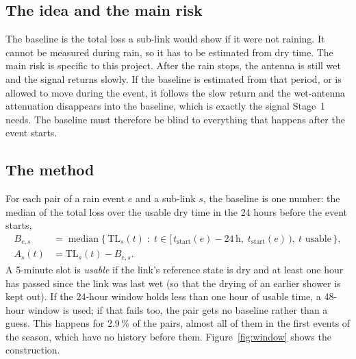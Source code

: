 \documentclass[11pt,a4paper]{article}
\begin{document}
\subsection{The idea and the main risk}

The baseline is the total loss a sub-link would show if it were not raining. It cannot be measured during rain, so it
has to be estimated from dry time. The main risk is specific to this project. After the rain stops, the antenna is
still wet and the signal returns slowly. If the baseline is estimated from that period, or is allowed to move during
the event, it follows the slow return and the wet-antenna attenuation disappears into the baseline, which is exactly
the signal Stage~1 needs. The baseline must therefore be blind to everything that happens after the event starts.

\subsection{The method}

For each pair of a rain event $e$ and a sub-link $s$, the baseline is one number: the median of the total loss over
the usable dry time in the 24 hours before the event starts,
\begin{equation}
\begin{aligned}
B_{e,s} &= \operatorname*{median}\bigl\{\, \mathrm{TL}_{s}(t) \;:\; t \in [\,t_{\mathrm{start}}(e) - 24\,\mathrm{h},\; t_{\mathrm{start}}(e)\,),\ t \text{ usable} \,\bigr\}, \\
A_{s}(t) &= \mathrm{TL}_{s}(t) - B_{e,s} .
\end{aligned}
\label{eq:baseline}
\end{equation}
A 5-minute slot is \emph{usable} if the link's reference state is dry and at least one hour has passed since the link
was last wet (so that the drying of an earlier shower is kept out). If the 24-hour window holds less than one hour of
usable time, a 48-hour window is used; if that fails too, the pair gets no baseline rather than a guess. This happens
for 2.9\,\% of the pairs, almost all of them in the first events of the season, which have no history before them.
Figure~\ref{fig:window} shows the construction.
\end{document}
